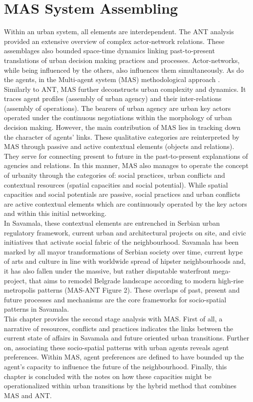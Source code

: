 \documentclass[11pt]{report}
\begin{document}
\chapter{MAS System Assembling}


Within an urban system, all elements are interdependent.
The ANT analysis provided an extensive overview of complex  actor-network relations. These assemblages also bounded space-time dynamics linking past-to-present translations of urban decision making practices and processes. Actor-networks, while being influenced by the others, also influences them simultaneously. As do the agents, in the Multi-agent system (MAS) methodological approach \cite{(Bousquet and Le Page, 2004)}.
\\
Similarly to ANT, MAS further deconstructs urban complexity and dynamics.
It traces agent profiles (assembly of urban agency) and their inter-relations (assembly of operations).
The bearers of urban agency are urban key actors operated under the continuous negotiations within the morphology of urban decision making.
However, the main contribution of MAS lies in tracking down the character of agents' links. These qualitative categories are reinterpreted by MAS through passive and active contextual elements (objects and relations). They serve for connecting present to future in the past-to-present explanations of agencies and relations.
In this manner, MAS also manages to operate the concept of urbanity through the categories of: social practices, urban conflicts and contextual resources (spatial capacities and social potential). While spatial capacities and social potentials are passive, social practices and urban conflicts are active contextual elements which are continuously operated by the key actors and within this initial networking.
\\
In Savamala, these contextual elements are entrenched in Serbian urban regulatory framework, current urban and architectural projects on site, and civic initiatives that activate social fabric of the neighbourhood.
Savamala has been marked by all mayor transformations of Serbian society over time, current hype of arts and culture in line with worldwide spread of hipster neighbourhoods and, it has also fallen under the massive, but rather disputable waterfront mega-project, that aims to remodel Belgrade landscape according to modern high-rise metropolis patterns (MAS-ANT Figure 2). These overlaps of past, present and future processes and mechanisms are the core frameworks for socio-spatial patterns in Savamala.
\\
This chapter provides the second stage analysis with MAS. 
First of all, a narrative of resources, conflicts and practices indicates the links between the current state of affairs in Savamala and future oriented urban transitions. 
Further on, associating these socio-spatial patterns with urban agents reveals agent preferences. Within MAS, agent preferences are defined to have bounded up the agent's capacity to influence the future of the neighbourhood.
Finally, this chapter is concluded with the notes on how these capacities might be operationalized within urban transitions by the hybrid method that combines MAS and ANT.
\end{document}
